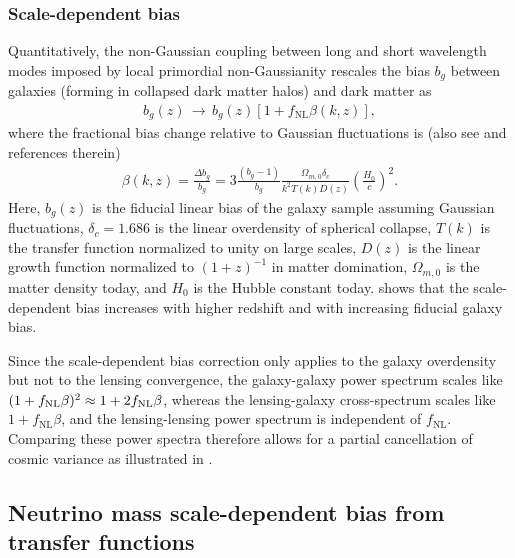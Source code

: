 \documentclass[prd,superscriptaddress,floatfix,notitlepage,nofootinbib,reprint]{revtex4-1} %
\begin{document}
\subsubsection{Scale-dependent bias}

Quantitatively, the non-Gaussian coupling between long and short wavelength modes imposed by local primordial non-Gaussianity rescales the bias $b_g$ between galaxies (forming in collapsed dark matter halos) and dark matter as
\begin{align}
  \label{eq:15}
  b_g(z) \,\rightarrow\, b_g(z)\left[1+f_\mathrm{NL}\beta(k,z)\right],
\end{align}
where the fractional bias change relative to Gaussian fluctuations is
\cite{Dalal0710,MatarreseVerde0801,Slosar0805} (also see \cite{Biagetti1611} and references therein)
\begin{align}
  \label{eq:fnlbias}
 \beta(k,z) =  \frac{\Delta b_g}{b_g} =  3\frac{(b_g-1)}{b_g}\frac{\Omega_{m,0}\delta_c}{k^2T(k)D(z)}\left(\frac{H_0}{c}\right)^2.
\end{align}
Here, $b_g(z)$ is the fiducial linear bias of the galaxy sample assuming Gaussian fluctuations, 
$\delta_c=1.686$ is the linear overdensity of spherical collapse,
$T(k)$ is the transfer function normalized to unity on large scales,
$D(z)$ is the linear growth function normalized to $(1+z)^{-1}$ in matter domination,
$\Omega_{m,0}$ is the matter density today,
and $H_0$ is the Hubble constant today.
 shows that the scale-dependent bias increases with higher redshift and with increasing fiducial galaxy bias.


Since the scale-dependent bias correction only applies to the galaxy overdensity but not to the lensing convergence, the galaxy-galaxy power spectrum scales like $(1+{f_\mathrm{NL}}\beta)^2\approx 1+2{f_\mathrm{NL}}\beta$, whereas the lensing-galaxy cross-spectrum scales like $1+f_\mathrm{NL}\beta$, and the lensing-lensing power spectrum is independent of $f_\mathrm{NL}$.
Comparing these power spectra therefore allows for a partial cancellation of cosmic variance as illustrated in .

\subsection{Neutrino mass scale-dependent bias from transfer functions}

\label{app:NeutrinoBasicsAppdx}
\end{document}
